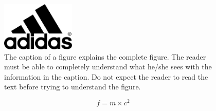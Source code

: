 \documentclass[conference]{IEEEtran}
\begin{document}
\begin{figure}[t!]
\centering
\includegraphics[width=3.5cm]{adidas.png}
\caption{The caption of a figure explains the complete figure. The reader must be able to completely understand what he/she sees with the information in the caption. Do not expect the reader to read the text before trying to understand the figure.}
\label{adidas}
\end{figure}

\begin{equation}
f = m \times c^2
\label{einstein}
\end{equation}
\end{document}
